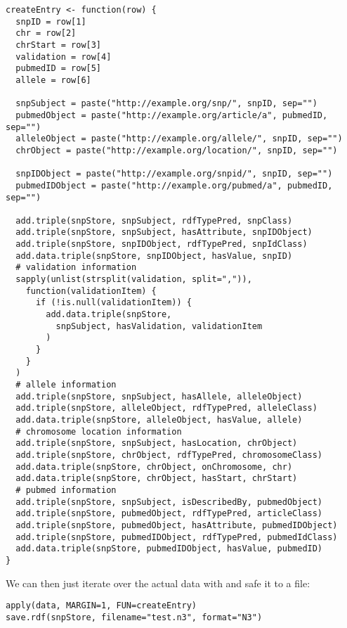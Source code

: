 \documentclass[12pt]{article}
\begin{document}
\begin{footnotesize}
\begin{verbatim}
createEntry <- function(row) {
  snpID = row[1]
  chr = row[2]
  chrStart = row[3]
  validation = row[4]
  pubmedID = row[5]
  allele = row[6]

  snpSubject = paste("http://example.org/snp/", snpID, sep="")
  pubmedObject = paste("http://example.org/article/a", pubmedID, sep="")
  alleleObject = paste("http://example.org/allele/", snpID, sep="")
  chrObject = paste("http://example.org/location/", snpID, sep="")

  snpIDObject = paste("http://example.org/snpid/", snpID, sep="")
  pubmedIDObject = paste("http://example.org/pubmed/a", pubmedID, sep="")

  add.triple(snpStore, snpSubject, rdfTypePred, snpClass)
  add.triple(snpStore, snpSubject, hasAttribute, snpIDObject)
  add.triple(snpStore, snpIDObject, rdfTypePred, snpIdClass)
  add.data.triple(snpStore, snpIDObject, hasValue, snpID)
  # validation information
  sapply(unlist(strsplit(validation, split=",")),
    function(validationItem) {
      if (!is.null(validationItem)) {
        add.data.triple(snpStore,
          snpSubject, hasValidation, validationItem
        )
      }
    }
  )
  # allele information
  add.triple(snpStore, snpSubject, hasAllele, alleleObject)
  add.triple(snpStore, alleleObject, rdfTypePred, alleleClass)
  add.data.triple(snpStore, alleleObject, hasValue, allele)
  # chromosome location information
  add.triple(snpStore, snpSubject, hasLocation, chrObject)
  add.triple(snpStore, chrObject, rdfTypePred, chromosomeClass)
  add.data.triple(snpStore, chrObject, onChromosome, chr)
  add.data.triple(snpStore, chrObject, hasStart, chrStart)
  # pubmed information
  add.triple(snpStore, snpSubject, isDescribedBy, pubmedObject)
  add.triple(snpStore, pubmedObject, rdfTypePred, articleClass)
  add.triple(snpStore, pubmedObject, hasAttribute, pubmedIDObject)
  add.triple(snpStore, pubmedIDObject, rdfTypePred, pubmedIdClass)
  add.data.triple(snpStore, pubmedIDObject, hasValue, pubmedID)
}
\end{verbatim}
\end{footnotesize}

We can then just iterate over the actual data with and safe it to a file:

\begin{footnotesize}
\begin{verbatim}
apply(data, MARGIN=1, FUN=createEntry)
save.rdf(snpStore, filename="test.n3", format="N3")
\end{verbatim}
\end{footnotesize}
\end{document}
